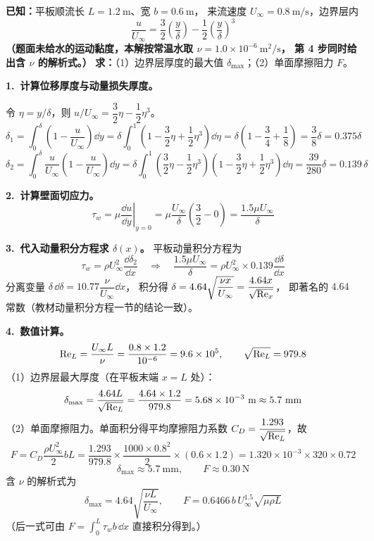 \begin{jie}
\textbf{已知：}平板顺流长 $L=1.2\ \mathrm{m}$、宽 $b=0.6\ \mathrm{m}$，
来流速度 $U_\infty=0.8\ \mathrm{m/s}$，边界层内
\[
\frac{u}{U_\infty}=\frac{3}{2}\left(\frac{y}{\delta}\right)-\frac{1}{2}\left(\frac{y}{\delta}\right)^3
\]
\textbf{（题面未给水的运动黏度，本解按常温水取 $\nu=1.0\times10^{-6}\ \mathrm{m^2/s}$，
第 4 步同时给出含 $\nu$ 的解析式。）}
\textbf{求：}（1）边界层厚度的最大值 $\delta_{\max}$；（2）单面摩擦阻力 $F$。

\textbf{1.\ 计算位移厚度与动量损失厚度。}

令 $\eta=y/\delta$，则 $u/U_\infty=\dfrac{3}{2}\eta-\dfrac{1}{2}\eta^3$。
\[
\delta_1=\int_0^{\delta}\left(1-\frac{u}{U_\infty}\right)\dd y
=\delta\int_0^1\left(1-\frac{3}{2}\eta+\frac{1}{2}\eta^3\right)\dd\eta
=\delta\left(1-\frac{3}{4}+\frac{1}{8}\right)=\frac{3}{8}\delta=0.375\delta
\]
\[
\delta_2=\int_0^{\delta}\frac{u}{U_\infty}\left(1-\frac{u}{U_\infty}\right)\dd y
=\delta\int_0^1\left(\frac{3}{2}\eta-\frac{1}{2}\eta^3\right)\left(1-\frac{3}{2}\eta+\frac{1}{2}\eta^3\right)\dd\eta
=\frac{39}{280}\delta=0.139\,\delta
\]

\textbf{2.\ 计算壁面切应力。}
\[
\tau_w=\mu\left.\frac{\dd u}{\dd y}\right|_{y=0}
=\mu\frac{U_\infty}{\delta}\left(\frac{3}{2}-0\right)=\frac{1.5\mu U_\infty}{\delta}
\]

\textbf{3.\ 代入动量积分方程求 $\delta(x)$。}
平板动量积分方程为
\[
\tau_w=\rho U_\infty^2\frac{\dd\delta_2}{\dd x}
\quad\Longrightarrow\quad
\frac{1.5\mu U_\infty}{\delta}=\rho U_\infty^2\times0.139\frac{\dd\delta}{\dd x}
\]
分离变量 $\delta\,\dd\delta=10.77\dfrac{\nu}{U_\infty}\dd x$，
积分得 $\delta=4.64\sqrt{\dfrac{\nu x}{U_\infty}}=\dfrac{4.64x}{\sqrt{\mathrm{Re}_x}}$，
即著名的 $4.64$ 常数（教材动量积分方程一节的结论一致）。

\textbf{4.\ 数值计算。}
\[
\mathrm{Re}_L=\frac{U_\infty L}{\nu}=\frac{0.8\times1.2}{10^{-6}}=9.6\times10^5,
\qquad \sqrt{\mathrm{Re}_L}=979.8
\]
（1）边界层最大厚度（在平板末端 $x=L$ 处）：
\[
\delta_{\max}=\frac{4.64L}{\sqrt{\mathrm{Re}_L}}=\frac{4.64\times1.2}{979.8}
=5.68\times10^{-3}\ \mathrm{m}\approx5.7\ \mathrm{mm}
\]
（2）单面摩擦阻力。单面积分得平均摩擦阻力系数
$\displaystyle C_D=\frac{1.293}{\sqrt{\mathrm{Re}_L}}$，故
\[
F=C_D\frac{\rho U_\infty^2}{2}bL
=\frac{1.293}{979.8}\times\frac{1000\times0.8^2}{2}\times(0.6\times1.2)
=1.320\times10^{-3}\times320\times0.72
\]
\[
\boxed{\,\delta_{\max}\approx5.7\ \mathrm{mm},\qquad F\approx0.30\ \mathrm{N}\,}
\]
含 $\nu$ 的解析式为
\[
\delta_{\max}=4.64\sqrt{\frac{\nu L}{U_\infty}},\qquad
F=0.6466\,b\,U_\infty^{1.5}\sqrt{\mu\rho L}
\]
（后一式可由 $F=\displaystyle\int_0^{L}\tau_w b\,\dd x$ 直接积分得到。）
\end{jie}

